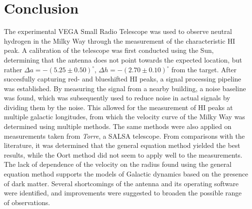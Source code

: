 \section{Conclusion}

The experimental VEGA Small Radio Telescope was used to observe neutral hydrogen in the Milky Way through the measurement of the characteristic HI peak. 
A calibration of the telescope was first conducted using the Sun, determining that the antenna does not point towards the expected location, but rather $\Delta a = -(5.25 \pm 0.50)^\circ$, $\Delta h = -(2.70 \pm 0.10)^\circ$ from the target. 
After succesfully capturing red- and blueshifted HI peaks, a signal processing pipeline was established. 
By measuring the signal from a nearby building, a noise baseline was found, which was subsequently used to reduce noise in actual signals by dividing them by the noise. 
This allowed for the measurement of HI peaks at multiple galactic longitudes, from which the velocity curve of the Milky Way was determined using multiple methods. 
The same methods were also applied on measurements taken from \emph{Torre}, a SALSA telescope. 
From comparisons with the literature, it was determined that the general equation method yielded the best results, while the Oort method did not seem to apply well to the measurements. 
The lack of dependence of the velocity on the radius found using the general equation method supports the models of Galactic dynamics based on the presence of dark matter.   
Several shortcomings of the antenna and its operating software were identified, and improvements were suggested to broaden the possible range of observations.
